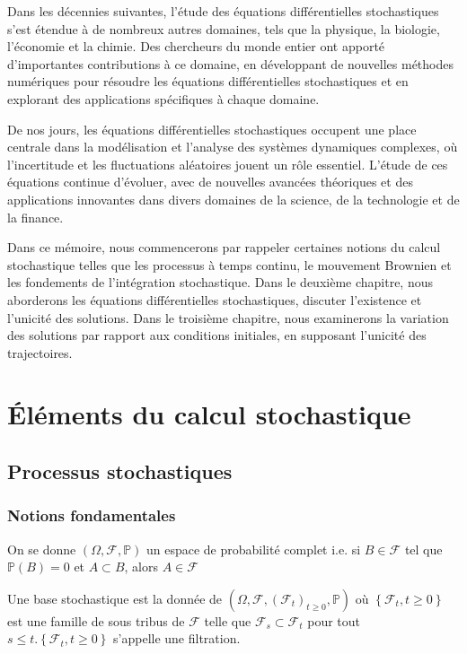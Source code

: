 \documentclass[A4paper,12pt]{report}
\newcommand{\pr}{{\mathbb{P}}}
\begin{document}
Dans les décennies suivantes, l'étude des équations différentielles stochastiques s'est étendue à de nombreux autres domaines, tels que la physique, la biologie, l'économie et  la chimie. Des chercheurs du monde entier ont apporté d'importantes contributions à ce domaine, en développant de nouvelles méthodes numériques pour résoudre les équations différentielles stochastiques et en explorant des applications spécifiques à chaque domaine.

De nos jours, les équations différentielles stochastiques occupent une place centrale dans la modélisation et l'analyse des systèmes dynamiques complexes, où l'incertitude et les fluctuations aléatoires jouent un rôle essentiel. L'étude de ces équations continue d'évoluer, avec de nouvelles avancées théoriques et des applications innovantes dans divers domaines de la science, de la technologie et de la finance.

Dans ce mémoire, nous commencerons par rappeler certaines notions du calcul stochastique telles que les processus à temps continu, le mouvement Brownien et les fondements de l'intégration stochastique. Dans le deuxième chapitre, nous aborderons les équations différentielles stochastiques, discuter l'existence et l'unicité des solutions. Dans le troisième chapitre, nous examinerons la variation des solutions par rapport aux conditions initiales, en supposant l'unicité des trajectoires.
\tableofcontents	

\chapter{Éléments du calcul stochastique}
\section{Processus stochastiques}
\subsection{Notions fondamentales}
On se donne $(\Omega, \mathcal{F}, \pr)$ un espace de probabilité complet i.e. si $B \in \mathcal{F}$ tel que $\pr(B)=0$ et $A \subset B$, alors $A \in \mathcal{F}$

Une base stochastique est la donnée de $\left(\Omega, \mathcal{F},\left(\mathcal{F}_{t}\right)_{t \geq 0}, \pr \right)$ où $\left\{\mathcal{F}_{t}, t \geq 0\right\}$ est une famille de sous tribus de $\mathcal{F}$ telle que $\mathcal{F}_{s} \subset \mathcal{F}_{t}$ pour tout $s \leq t .\left\{\mathcal{F}_{t}, t \geq 0\right\}$ s'appelle une filtration.
\end{document}
